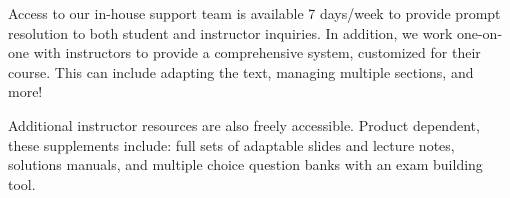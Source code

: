 \begin{center}
  \begin{multicols}{2}
    \parbox{0.9\linewidth}{
      Access to our in-house support team is available 7 days/week to provide prompt resolution to both student and instructor inquiries. In addition, we work one-on-one with instructors to provide a comprehensive system, customized for their course. This can include adapting the text, managing multiple sections, and more!
    }

    \columnbreak
    \parbox{0.9\linewidth}{
      Additional instructor resources are also freely accessible. Product dependent, these supplements include: full sets of adaptable slides and lecture notes, solutions manuals, and multiple choice question banks with an exam building tool.
    }
  \end{multicols}
\end{center}

\vfill

\begin{center}
  \textcolor{lscstextcolour}{\textbf{\fontsize{18}{22}\selectfont {Contact Lyryx Today!}}} \\
  \medskip
  \textcolor{lyryxcolour}{\textbf{\fontsize{14}{18}\selectfont {info@lyryx.com}}} \\

\end{center}

\vfill


\setlength{\parskip}{\baselineskip}
